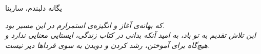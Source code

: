 \beginto
\begin{center}
	
	\vspace{1.5cm}
	
	{\Large یگانه دلبندم، سارینا}
	
	\vspace{0.8cm}
	
	\parbox{0.8\textwidth}{
		\centering\em\Large
		که بهانه‌ی آغاز و انگیزه‌ی استمرارم در این مسیر بود. \\
		این تلاش تقدیم به تو باد، به امید آنکه بدانی در کتاب زندگی، ایستایی معنایی ندارد و هیچ‌گاه برای آموختن، رشد کردن و دویدن به سوی فرداها دیر نیست. \\
	
	}
\end{center}

\endto